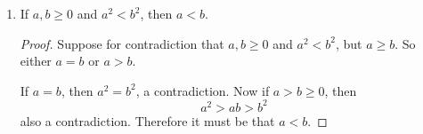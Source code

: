 \begin{exercise}[\textbf{5}]
\begin{enumerate}
         \begin{proof}Assume that $0 \leq a<b$. If $a=0$, then $a^2 = 0$ so that 
              \begin{equation*}
                  a^2 < b^2.
              \end{equation*}
              Suppose that $a>0$. From our assumption, $a<b$ therefore
              \begin{equation*}
                a^2 < ab < b^2.
              \end{equation*}
         \end{proof}
         \item If $a,b \geq 0$ and $a^2<b^2$, then $a<b$.
         \begin{proof}Suppose for contradiction that $a,b \geq 0$ and $a^2<b^2$,
         but $a \geq b$. So either $a=b$ or $a>b$.

         If $a=b$, then $a^2=b^2$, a contradiction. Now if $a>b \geq 0$, then 
            \begin{equation*}
                a^2 > ab> b^2
            \end{equation*}
            also a contradiction. Therefore it must be that $a<b$.
         \end{proof}
     \end{enumerate}
\end{exercise}
\pagebreak
